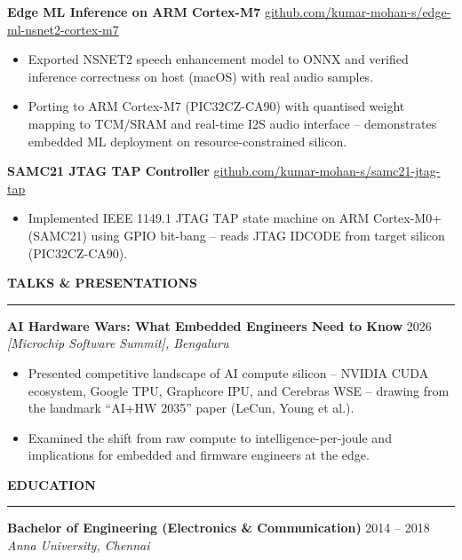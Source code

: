 \documentclass[11pt,a4paper]{article}
\newcommand{\resumesection}[1]{
    \vspace{1.2em} 
    {\large \textbf{\uppercase{#1}}}
    \vspace{0.2em}
    \hrule
    \vspace{0.6em} 
}
\newenvironment{achievements}{
    \begin{itemize}[leftmargin=1.5em, itemsep=4pt, topsep=2pt, parsep=0pt]
}{
    \end{itemize}
    \vspace{0.6em} 
}
\begin{document}
\noindent
\textbf{Edge ML Inference on ARM Cortex-M7} 
\hfill \href{https://github.com/kumar-mohan-s/edge-ml-nsnet2-cortex-m7}{github.com/kumar-mohan-s/edge-ml-nsnet2-cortex-m7}
\begin{achievements}
    \item Exported NSNET2 speech enhancement model to ONNX and verified inference correctness on host (macOS) with real audio samples.
    \item Porting to ARM Cortex-M7 (PIC32CZ-CA90) with quantised weight mapping to TCM/SRAM and real-time I2S audio interface -- demonstrates embedded ML deployment on resource-constrained silicon.
\end{achievements}


\noindent
\textbf{SAMC21 JTAG TAP Controller} \hfill
\href{https://github.com/kumar-mohan-s/samc21-jtag-tap}
{github.com/kumar-mohan-s/samc21-jtag-tap}
\begin{achievements}
    \item Implemented IEEE 1149.1 JTAG TAP state machine on ARM Cortex-M0+ (SAMC21) using GPIO bit-bang -- reads JTAG IDCODE from target silicon (PIC32CZ-CA90).
\end{achievements}

\resumesection{Talks \& Presentations}

\noindent
\textbf{AI Hardware Wars: What Embedded Engineers 
Need to Know} \hfill 2026 \\
\textit{[Microchip Software Summit], Bengaluru}
\begin{achievements}
    \item Presented competitive landscape of AI compute silicon -- NVIDIA CUDA ecosystem, Google TPU, Graphcore IPU, and Cerebras WSE -- drawing from the landmark ``AI+HW 2035'' paper (LeCun, Young et al.).
    \item Examined the shift from raw compute to intelligence-per-joule and implications for embedded and firmware engineers at the edge.
\end{achievements}

\resumesection{Education}
\noindent
\textbf{Bachelor of Engineering (Electronics \& Communication)} \hfill 2014 -- 2018 \\
\textit{Anna University, Chennai}
\end{document}
